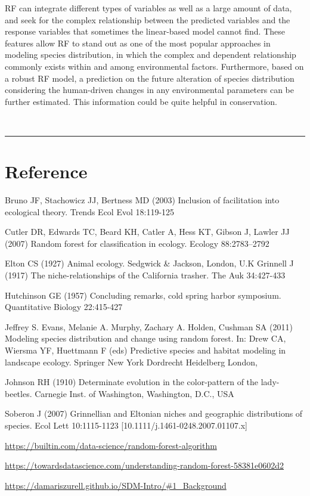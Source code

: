 \documentclass[
]{article}
\begin{document}
RF can integrate different types of variables as well as a large amount
of data, and seek for the complex relationship between the predicted
variables and the response variables that sometimes the linear-based
model cannot find. These features allow RF to stand out as one of the
most popular approaches in modeling species distribution, in which the
complex and dependent relationship commonly exists within and among
environmental factors. Furthermore, based on a robust RF model, a
prediction on the future alteration of species distribution considering
the human-driven changes in any environmental parameters can be further
estimated. This information could be quite helpful in conservation.

~

\begin{center}\rule{0.5\linewidth}{0.5pt}\end{center}

\hypertarget{reference}{%
\section{Reference}\label{reference}}

Bruno JF, Stachowicz JJ, Bertness MD (2003) Inclusion of facilitation
into ecological theory. Trends Ecol Evol 18:119-125

Cutler DR, Edwards TC, Beard KH, Catler A, Hess KT, Gibson J, Lawler JJ
(2007) Random forest for classification in ecology. Ecology
88:2783--2792

Elton CS (1927) Animal ecology. Sedgwick \& Jackson, London, U.K
Grinnell J (1917) The niche-relationships of the California trasher. The
Auk 34:427-433

Hutchinson GE (1957) Concluding remarks, cold spring harbor symposium.
Quantitative Biology 22:415-427

Jeffrey S. Evans, Melanie A. Murphy, Zachary A. Holden, Cushman SA
(2011) Modeling species distribution and change using random forest. In:
Drew CA, Wiersma YF, Huettmann F (eds) Predictive species and habitat
modeling in landscape ecology. Springer New York Dordrecht Heidelberg
London,

Johnson RH (1910) Determinate evolution in the color-pattern of the
lady-beetles. Carnegie Inst. of Washington, Washington, D.C., USA

Soberon J (2007) Grinnellian and Eltonian niches and geographic
distributions of species. Ecol Lett 10:1115-1123
{[}10.1111/j.1461-0248.2007.01107.x{]}

\url{https://builtin.com/data-science/random-forest-algorithm}

\url{https://towardsdatascience.com/understanding-random-forest-58381e0602d2}

\url{https://damariszurell.github.io/SDM-Intro/\#1_Background}
\end{document}
